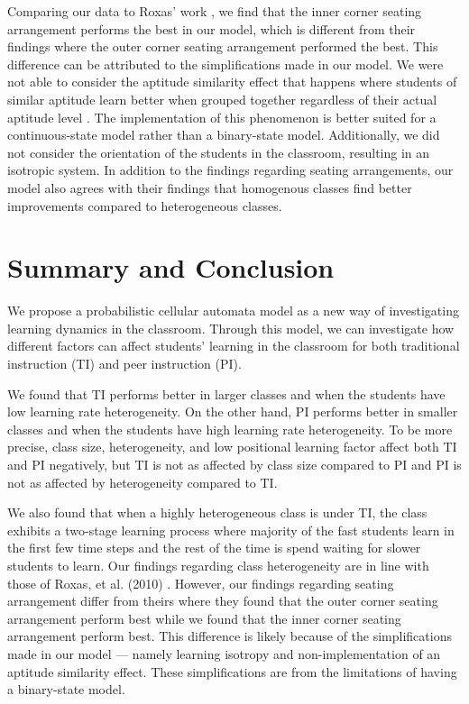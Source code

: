 \documentclass[twocolumn,secnumarabic,amssymb, nobibnotes, aps, prd]{revtex4-2}
\begin{document}
        Comparing our data to Roxas' work \cite{roxas2010seating}, we find that the inner corner seating arrangement performs the best in our model, which is different from their findings where the outer corner seating arrangement performed the best.
        This difference can be attributed to the simplifications made in our model.
        We were not able to consider the aptitude similarity effect that happens where students of similar aptitude learn better when grouped together regardless of their actual aptitude level \cite{smith2009peer}.
        The implementation of this phenomenon is better suited for a continuous-state model rather than a binary-state model.
        Additionally, we did not consider the orientation of the students in the classroom, resulting in an isotropic system.
        In addition to the findings regarding seating arrangements, our model also agrees with their findings that homogenous classes find better improvements compared to heterogeneous classes.
    
\section{Summary and Conclusion}
    We propose a probabilistic cellular automata model as a new way of investigating learning dynamics in the classroom.
    Through this model, we can investigate how different factors can affect students' learning in the classroom for both traditional instruction (TI) and peer instruction (PI).

    We found that TI performs better in larger classes and when the students have low learning rate heterogeneity.
    On the other hand, PI performs better in smaller classes and when the students have high learning rate heterogeneity.
    To be more precise, class size, heterogeneity, and low positional learning factor affect both TI and PI negatively, but TI is not as affected by class size compared to PI and PI is not as affected by heterogeneity compared to TI.

    We also found that when a highly heterogeneous class is under TI, the class exhibits a two-stage learning process where majority of the fast students learn in the first few time steps and the rest of the time is spend waiting for slower students to learn. Our findings regarding class heterogeneity are in line with those of Roxas, et al. (2010) \cite{roxas2010seating}.
    However, our findings regarding seating arrangement differ from theirs where they found that the outer corner seating arrangement perform best while we found that the inner corner seating arrangement perform best.
    This difference is likely because of the simplifications made in our model --- namely learning isotropy and non-implementation of an aptitude similarity effect.
    These simplifications are from the limitations of having a binary-state model.
\end{document}
